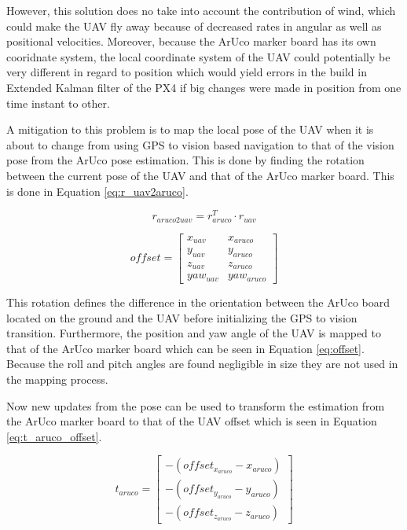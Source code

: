 \documentclass[../Head/report.tex]{subfiles}
\begin{document}
However, this  solution does no take into account the contribution of wind, which could make the UAV fly away because of decreased rates in angular as well as positional velocities. Moreover, because the ArUco marker board has its own cooridnate system, the local coordinate system of the UAV could potentially be very different in regard to position which would yield errors in the build in Extended Kalman filter of the PX4 if big changes were made in position from one time instant to other.    

A mitigation to this problem is to map the local pose of the UAV when it is about to change from using GPS to vision based navigation to that of the vision pose from the ArUco pose estimation. This is done by finding the rotation between the current pose of the UAV and that of the ArUco marker board. This is done in Equation \ref{eq:r_uav2aruco}.

\begin{equation}
	r_{aruco2uav} = r_{aruco}^T \cdot r_{uav}
	\label{eq:r_uav2aruco}
\end{equation}

\begin{equation}
	offset = \begin{bmatrix}
						  x_{uav} & x_{aruco}\\
						  y_{uav} & y_{aruco}\\
						  z_{uav} & z_{aruco}\\
						  yaw_{uav} & yaw_{aruco}
					     \end{bmatrix}
\label{eq:offset}
\end{equation}

This rotation defines the difference in the orientation between the ArUco board located on the ground and the UAV before initializing the GPS to vision transition. Furthermore, the position and yaw angle of the UAV is mapped to that of the ArUco marker board which can be seen in Equation \ref{eq:offset}. Because the roll and pitch angles are found negligible in size they are not used in the mapping process. 

Now new updates from the pose can be used to transform the estimation from the ArUco marker board to that of the UAV offset which is seen in Equation \ref{eq:t_aruco_offset}.     

\begin{equation}
	t_{aruco} = \begin{bmatrix}
			   -(offset_{x_{aruco}} - x_{aruco})\\
			   -(offset_{y_{aruco}} - y_{aruco})\\
			   -(offset_{z_{aruco}} - z_{aruco})
			   \end{bmatrix}
\label{eq:t_aruco_offset}
\end{equation}
\end{document}
